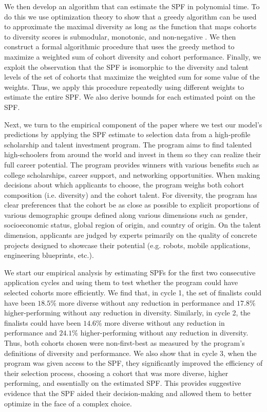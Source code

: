 We then develop an algorithm that can estimate the SPF in polynomial time. To do this we use optimization theory to show that a greedy algorithm can be used to approximate the maximal diversity as long as the function that maps cohorts to diversity scores is submodular, monotonic, and non-negative \cite{krause2014submodular, huppenkothen2020entrofy}. We then construct a formal algorithmic procedure that uses the greedy method to maximize a weighted sum of cohort diversity and cohort performance. Finally, we exploit the observation that the SPF is isomorphic to the diversity and talent levels of the set of cohorts that maximize the weighted sum for some value of the weights. Thus, we apply this procedure repeatedly using different weights to estimate the entire SPF. We also derive bounds for each estimated point on the SPF. 

Next, we turn to the empirical component of the paper where we test our model's predictions by applying the SPF estimate to selection data from a high-profile scholarship and talent investment program. The program aims to find talented high-schoolers from around the world and invest in them so they can realize their full career potential. The program provides winners with various benefits such as college scholarships, career support, and networking opportunities. When making decisions about which applicants to choose, the program weighs both cohort composition (i.e. diversity) and the cohort talent. For diversity, the program has clear preferences that the cohort be as close as possible to explicit proportions of various demographic groups defined along various dimensions such as gender, socioeconomic status, global region of origin, and country of origin. On the talent dimension, applicants are judged by experts primarily on the quality of concrete projects designed to showcase their potential (e.g. robots, mobile applications, engineering blueprints, etc.).

We start our empirical analysis by estimating SPFs for the first two consecutive application cycles and using them to test whether the program could have selected cohorts more efficiently. We find that, in cycle 1, the set of finalists could have been $18.5\%$ more diverse without any reduction in performance and $17.8\%$ higher-performing without any reduction in diversity. Similarly, in cycle 2, the finalists could have been $14.6\%$ more diverse without any reduction in performance and $24.1\%$ higher-performing without any reduction in diversity. Thus, both cohorts chosen were non-first-best as measured by the program's definitions of diversity and performance. We also show that in cycle 3, when the program was given access to the SPF, they significantly improved the efficiency of their selection process, choosing a cohort that was more diverse, higher performing, and essentially on the estimated SPF. This provides suggestive evidence that the SPF aided their decision-making and allowed them to better optimize in the face of a complex choice.

